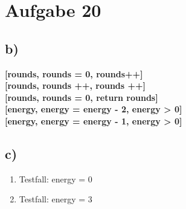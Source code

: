 	\section*{Aufgabe 20}
		\subsection*{b)}
			\textbf{[rounds, rounds = 0, rounds++]} \\
			\textbf{[rounds, rounds ++, rounds ++]} \\
			\textbf{[rounds, rounds = 0, return rounds]} \\
			\textbf{[energy, energy = energy - 2, energy > 0]} \\
			\textbf{[energy, energy = energy - 1, energy > 0]}
		\subsection*{c)}
			\begin{enumerate}
				\item Testfall: energy = 0
				\item Testfall: energy = 3
			\end{enumerate}

